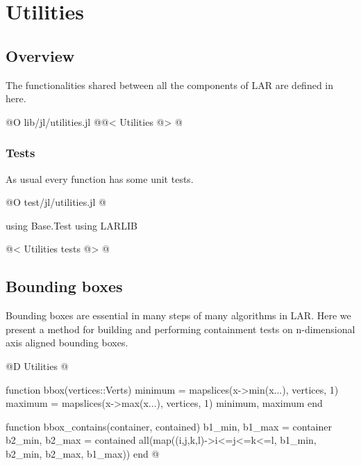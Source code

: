 \chapter{Utilities}
\label{ch:utilities}

\section{Overview}

The functionalities shared between all the components of LAR
are defined in here.

@O lib/jl/utilities.jl
@{@< Utilities @>
@}

\subsection{Tests}
As usual every function has some unit tests.

@O test/jl/utilities.jl
@{using Base.Test
using LARLIB

@< Utilities tests @>
@}


\section{Bounding boxes}
\label{sec:bboxes}

Bounding boxes are essential in many steps of many
algorithms in LAR. Here we present a method for building
and performing containment tests on n-dimensional 
axis aligned bounding boxes.

@D Utilities
@{function bbox(vertices::Verts)
    minimum = mapslices(x->min(x...), vertices, 1)
    maximum = mapslices(x->max(x...), vertices, 1)
    minimum, maximum
end

function bbox_contains(container, contained)
    b1_min, b1_max = container
    b2_min, b2_max = contained
    all(map((i,j,k,l)->i<=j<=k<=l, b1_min, b2_min, b2_max, b1_max))
end
@}


